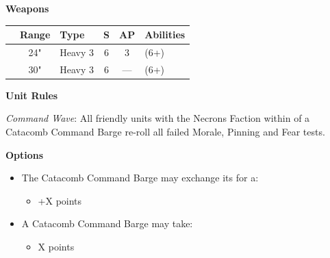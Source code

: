 \begin{minipage}[t]{0.72\textwidth}
	\vspace*{2em}
	\textbf{Weapons}
	
	\begin{tabular}{L{90 pt} c C{40pt} *{2}{c} >{\raggedright\arraybackslash}p{130pt}}
		& Range & Type & S & AP & Abilities \\
		\hline
		 & 24" & Heavy 3 & 6 & 3 &  (6+) \\
		 & 30" & Heavy 3 & 6 & — &  (6+) \\
	\end{tabular}
	
	\vspace*{2em}
	\textbf{Unit Rules}
	
	\textit{Command Wave}: All friendly units with the Necrons Faction within  of a Catacomb Command Barge re-roll all failed Morale, Pinning and Fear tests.
	
	\vspace*{2em}
	\textbf{Options}
	\begin{itemize}
		\item The Catacomb Command Barge may exchange its  for a:
		\begin{itemize}
			\item {} \dotfill +X points
		\end{itemize}
		\item A Catacomb Command Barge may take:
		\begin{itemize}
			\item {} \dotfill X points
		\end{itemize} 
	\end{itemize}
\end{minipage}
\hspace{0.5em}
